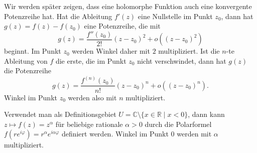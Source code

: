 Wir werden später zeigen, dass eine holomorphe Funktion auch eine 
konvergente Potenzreihe hat.
Hat die Ableitung $f'(z)$ eine Nullstelle im Punkt $z_0$, dann hat
$ g(z) = f(z) - f(z_0) $
eine Potenzreihe, die mit
\[
g(z)
=
\frac{f''(z_0)}{2!}(z-z_0)^2 + o((z-z_0)^2)
\]
beginnt.
Im Punkt $z_0$ werden Winkel daher mit $2$ multipliziert.
Ist die $n$-te Ableitung von $f$ die erste, die im Punkt $z_0$
nicht verschwindet, dann hat $g(z)$ die Potenzreihe
\[
g(z)
=
\frac{f^{(n)}(z_0)}{n!}(z-z_0)^n + o((z-z_0)^n).
\]
Winkel im Punkt $z_0$ werden also mit $n$ multipliziert.

Verwendet man als Definitionsgebiet
$U = \mathbb{C}\setminus\{x\in\mathbb{R} \mid x < 0\}$,
dann kann $z\mapsto f(z)=z^\alpha$ für beliebige rationale $\alpha>0$
durch die Polarformel $f(re^{i\varphi})=r^\alpha e^{i\alpha\varphi}$
definiert werden.
Winkel im Punkt $0$ werden mit $\alpha$ multipliziert.

%
%
